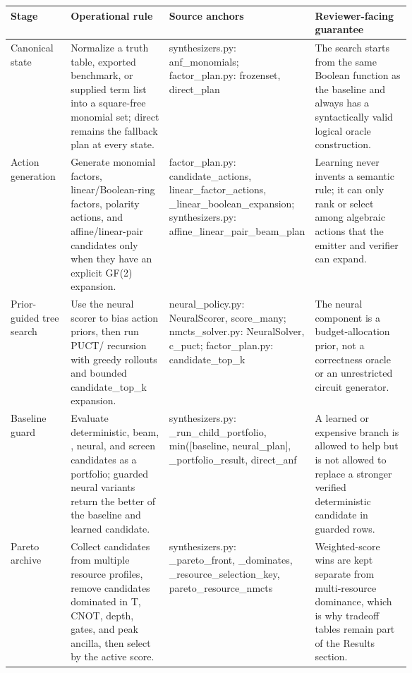 \begin{tabularx}{\linewidth}{>{\raggedright\arraybackslash}p{0.15\linewidth}>{\raggedright\arraybackslash}X>{\raggedright\arraybackslash}p{0.27\linewidth}>{\raggedright\arraybackslash}p{0.24\linewidth}}
\toprule
Stage & Operational rule & Source anchors & Reviewer-facing guarantee \\
\midrule
Canonical state & Normalize a truth table, exported benchmark, or supplied term list into a square-free \anf{} monomial set; direct \anf{} remains the fallback plan at every state. & synthesizers.py: anf\_monomials; factor\_plan.py: frozenset, direct\_plan & The search starts from the same Boolean function as the baseline and always has a syntactically valid logical oracle construction. \\
Action generation & Generate monomial factors, linear/Boolean-ring factors, \fprm{} polarity actions, and affine/linear-pair candidates only when they have an explicit GF(2) expansion. & factor\_plan.py: candidate\_actions, linear\_factor\_actions, \_linear\_boolean\_expansion; synthesizers.py: affine\_linear\_pair\_beam\_plan & Learning never invents a semantic rule; it can only rank or select among algebraic actions that the emitter and verifier can expand. \\
Prior-guided tree search & Use the neural scorer to bias action priors, then run PUCT/\mcts{} recursion with greedy rollouts and bounded candidate\_top\_k expansion. & neural\_policy.py: NeuralScorer, score\_many; nmcts\_solver.py: Neural\mcts{}Solver, c\_puct; factor\_plan.py: candidate\_top\_k & The neural component is a budget-allocation prior, not a correctness oracle or an unrestricted circuit generator. \\
Baseline guard & Evaluate deterministic, beam, \mcts{}, neural, and screen candidates as a portfolio; guarded neural variants return the better of the baseline and learned candidate. & synthesizers.py: \_run\_child\_portfolio, min([baseline, neural\_plan], \_portfolio\_result, direct\_anf & A learned or expensive branch is allowed to help but is not allowed to replace a stronger verified deterministic candidate in guarded rows. \\
Pareto archive & Collect candidates from multiple resource profiles, remove candidates dominated in T, CNOT, depth, gates, and peak ancilla, then select by the active score. & synthesizers.py: \_pareto\_front, \_dominates, \_resource\_selection\_key, pareto\_resource\_nmcts & Weighted-score wins are kept separate from multi-resource dominance, which is why tradeoff tables remain part of the Results section. \\

\end{tabularx}
